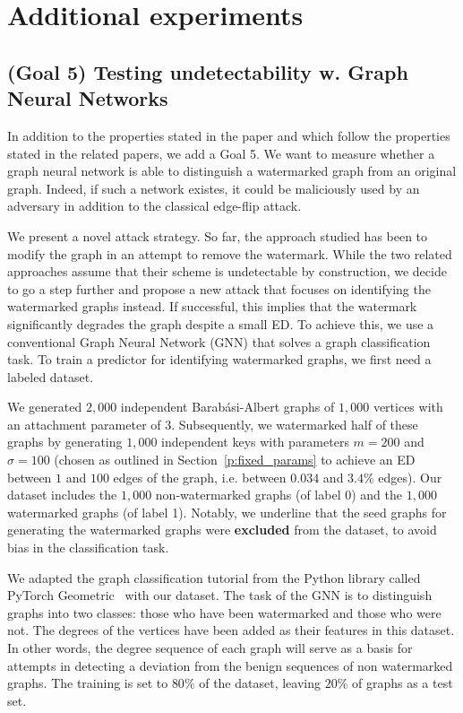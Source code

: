 \section{Additional experiments}\label{a:add-exp}
\subsection{(Goal 5) Testing undetectability w. Graph Neural Networks}
In addition to the properties stated in the paper and which follow the properties stated in the related papers, we add a Goal 5. We want to measure whether a graph neural network is able to distinguish a watermarked graph from an original graph. Indeed, if such a network existes, it could be maliciously used by an adversary in addition to the classical edge-flip attack.

We present a novel attack strategy. So far, the approach studied has been to modify the graph in an attempt to remove the watermark. While the two related approaches assume that their scheme is undetectable by construction, we decide to go a step further and propose a new attack that focuses on identifying the watermarked graphs instead. If successful, this implies that the watermark significantly degrades the graph despite a small ED. To achieve this, we use a conventional Graph Neural Network (GNN) that solves a graph classification task. To train a predictor for identifying watermarked graphs, we first need a labeled dataset. 

We generated $2,000$ independent Barabási-Albert graphs of $1,000$ vertices with an attachment parameter of $3$. Subsequently, we watermarked half of these graphs by generating $1,000$ independent keys with parameters $m = 200$ and $\sigma = 100$ (chosen as outlined in Section~\ref{p:fixed_params} to achieve an ED between $1$ and $100$ edges of the graph, i.e. between $0.034$ and $3.4$\% edges). 
Our dataset includes the $1,000$ non-watermarked graphs (of label 0) and the $1,000$ watermarked graphs (of label 1). Notably, we underline that the seed graphs for generating the watermarked graphs were \textbf{excluded} from the dataset, to avoid bias in the classification task.

We adapted the graph classification tutorial from the Python library called PyTorch Geometric~\cite{GNNtuto} with our dataset. The task of the GNN is to distinguish graphs into two classes: those who have been watermarked and those who were not. The degrees of the vertices have been added as their features in this dataset. In other words, the degree sequence of each graph will serve as a basis for attempts in detecting a deviation from the benign sequences of non watermarked graphs.
The training is set to $80$\% of the dataset, leaving $20$\% of graphs as a test set.


